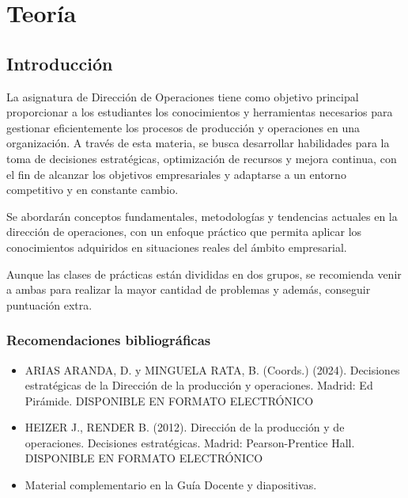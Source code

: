 \documentclass[12pt]{book} %
\providecommand{\tightlist}{%
  \setlength{\itemsep}{0pt}\setlength{\parskip}{0pt}}
\begin{document}
\part{Teoría}

\hypertarget{introducciuxf3n}{%
\chapter{Introducción}\label{introducciuxf3n}}

La asignatura de Dirección de Operaciones tiene como objetivo principal
proporcionar a los estudiantes los conocimientos y herramientas
necesarios para gestionar eficientemente los procesos de producción y
operaciones en una organización. A través de esta materia, se busca
desarrollar habilidades para la toma de decisiones estratégicas,
optimización de recursos y mejora continua, con el fin de alcanzar los
objetivos empresariales y adaptarse a un entorno competitivo y en
constante cambio.

Se abordarán conceptos fundamentales, metodologías y tendencias actuales
en la dirección de operaciones, con un enfoque práctico que permita
aplicar los conocimientos adquiridos en situaciones reales del ámbito
empresarial.

Aunque las clases de prácticas están divididas en dos grupos, se
recomienda venir a ambas para realizar la mayor cantidad de problemas y
además, conseguir puntuación extra.

\hypertarget{recomendaciones-bibliogruxe1ficas}{%
\section{Recomendaciones
bibliográficas}\label{recomendaciones-bibliogruxe1ficas}}

\begin{itemize}
\tightlist
\item
  ARIAS ARANDA, D. y MINGUELA RATA, B. (Coords.) (2024). Decisiones
  estratégicas de la Dirección de la producción y operaciones. Madrid:
  Ed Pirámide. DISPONIBLE EN FORMATO ELECTRÓNICO\\
\item
  HEIZER J., RENDER B. (2012). Dirección de la producción y de
  operaciones. Decisiones estratégicas. Madrid: Pearson-Prentice Hall.
  DISPONIBLE EN FORMATO ELECTRÓNICO\\
\item
  Material complementario en la Guía Docente y diapositivas.
\end{itemize}
\end{document}
